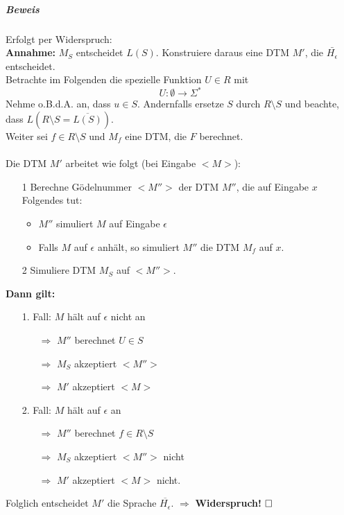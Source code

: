 \documentclass[fleqn]{scrartcl}
\begin{document}
\subparagraph{Beweis} Erfolgt per Widerspruch:\\
\textbf{Annahme:} $M_S$ entscheidet $L(S)$. Konstruiere daraus eine DTM $M'$, die $\bar{H_\epsilon}$ entscheidet.\\

Betrachte im Folgenden die spezielle Funktion $U \in R$ mit
\[U: \emptyset \rightarrow \Sigma^*\]
%
Nehme o.B.d.A. an, dass $u \in S$. Andernfalls ersetze $S$ durch $R \setminus S$ und beachte, dass $L(R\setminus S = \overline{L(S)})$.\\
%
Weiter sei $f \in R\setminus S$ und $M_f$ eine DTM, die $F$ berechnet.\\\\
%
Die DTM $M'$ arbeitet wie folgt (bei Eingabe $<M>$):
\begin{itemize}
\item[1] Berechne Gödelnummer $<M''>$ der DTM $M''$, die auf Eingabe $x$ Folgendes tut:
\begin{itemize}
\item $M''$ simuliert $M$ auf Eingabe $\epsilon$
\item Falls $M$ auf $\epsilon$ anhält, so simuliert $M''$ die DTM $M_f$ auf $x$.
\end{itemize}
\item[2] Simuliere DTM $M_S$ auf $<M''>$.
\end{itemize}

\textbf{Dann gilt:}
\begin{itemize}
\item[1. Fall:] $M$ hält auf $\epsilon$ nicht an
\begin{itemize}
\item[$\Rightarrow$] $M''$ berechnet $U \in S$
\item[$\Rightarrow$] $M_S$ akzeptiert $<M''>$
\item[$\Rightarrow$] $M'$ akzeptiert $<M>$
\end{itemize}
\item[2. Fall:] $M$ hält auf $\epsilon$ an
\begin{itemize}
\item[$\Rightarrow$] $M''$ berechnet $f \in R \setminus S$
\item[$\Rightarrow$] $M_S$ akzeptiert $<M''>$ nicht
\item[$\Rightarrow$] $M'$ akzeptiert $<M>$ nicht.
\end{itemize}
\end{itemize}
Folglich entscheidet $M'$ die Sprache $\overline{H_\epsilon}$. $\Rightarrow$ \textbf{Widerspruch!} $\hfill \square$
\end{document}

